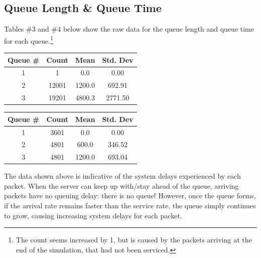 \documentclass{article}
\begin{document}
\newpage
\subsection*{Queue Length \& Queue Time}
Tables \#3 and \#4 below show the raw data for the queue length and queue time for each queue.\footnote{The count seems increased by 1, but is caused by the packets arriving at the end of the simulation, that had not been serviced.}
\vspace{.25cm}

\begin{minipage}{0.5\textwidth}
	\centering
	\begin{tabular}{|c|c|c|c|} \hline
		\textbf{Queue \#} & \textbf{Count} & \textbf{Mean} & \textbf{Std. Dev} \\ \hline
		1 & 1 & 0.0 & 0.00 \\ \hline
		2 & 12001 & 1200.0 & 692.91 \\ \hline
		3 & 19201 & 4800.3 & 2771.50 \\ \hline
	\end{tabular}
	\label{qlen}
\end{minipage}  
\begin{minipage}{0.5\textwidth}
	\centering
	\begin{tabular}{|c|c|c|c|} \hline
		\textbf{Queue \#} & \textbf{Count} & \textbf{Mean} & \textbf{Std. Dev} \\ \hline
		1 & 3601 & 0.0 & 0.00 \\ \hline
		2 & 4801 & 600.0 & 346.52 \\ \hline
		3 & 4801 & 1200.0 & 693.04 \\ \hline
	\end{tabular}
	\label{qTime}
\end{minipage}
\vspace{.25cm}

The data shown above is indicative of the system delays experienced by each packet.
When the server can keep up with/stay ahead of the queue, arriving packets have no queuing delay:  there is no queue!
However, once the queue forms, if the arrival rate remains faster than the service rate, the queue simply continues to grow, causing increasing system delays for each packet.
\end{document}
